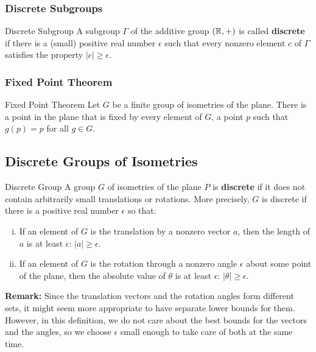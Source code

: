 \documentclass[letterpaper]{article}
\begin{document}
\subsubsection{Discrete Subgroups}
\begin{definition}{Discrete Subgroup}{}
    A subgroup $\Gamma$ of the additive group $(\mathbb{R}, +)$ is called \textbf{discrete} if there is a (small) positive real number $\epsilon$ such that every nonzero element $c$ of $\Gamma$ satisfies the property $|c| \geq \epsilon$. 
\end{definition}

\subsubsection{Fixed Point Theorem}
\begin{theorem}{Fixed Point Theorem}{}
    Let $G$ be a finite group of isometries of the plane. There is a point in the plane that is fixed by every element of $G$, a point $p$ such that $g(p) = p$ for all $g \in G$. 
\end{theorem}


\subsection{Discrete Groups of Isometries}
\begin{definition}{Discrete Group}{}
    A group $G$ of isometries of the plane $P$ is \textbf{discrete} if it does not contain arbitrarily small translations or rotations. More precisely, $G$ is discrete if there is a positive real number $\epsilon$ so that: 
    \begin{enumerate}[(i)]
        \item If an element of $G$ is the translation by a nonzero vector $a$, then the length of $a$ is at least $\epsilon$: $|a| \geq \epsilon$.
        \item If an element of $G$ is the rotation through a nonzero angle $\epsilon$ about some point of the plane, then the absolute value of $\theta$ is at least $\epsilon$: $|\theta| \geq \epsilon$.
    \end{enumerate}
\end{definition}
\textbf{Remark:} Since the translation vectors and the rotation angles form different sets, it might seem more appropriate to have separate lower bounds for them. However, in this definition, we do not care about the best bounds for the vectors and the angles, so we choose $\epsilon$ small enough to take care of both at the same time. 
\end{document}
